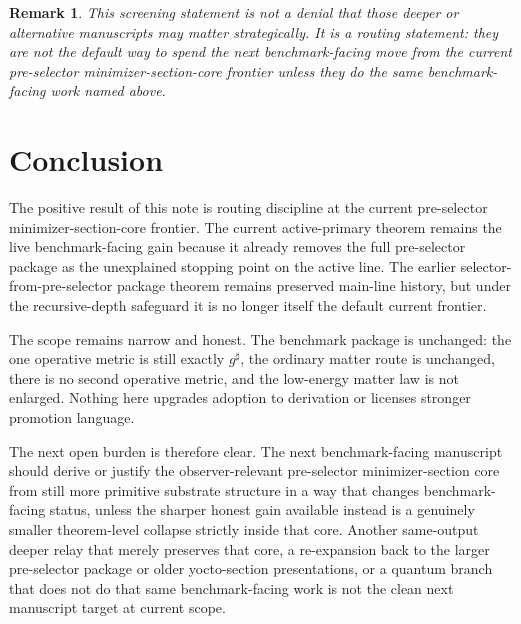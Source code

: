 \documentclass[11pt]{article}
\newcommand{\CompletedMetric}{g^{\sharp}}
\newtheorem{remark}{Remark}
\begin{document}
\begin{remark}
This screening statement is not a denial that those deeper or alternative manuscripts may matter strategically. It is a routing statement: they are not the default way to spend the next benchmark-facing move from the current pre-selector minimizer-section-core frontier unless they do the same benchmark-facing work named above.
\end{remark}

\section{Conclusion}

The positive result of this note is routing discipline at the current pre-selector minimizer-section-core frontier. The current active-primary theorem remains the live benchmark-facing gain because it already removes the full pre-selector package as the unexplained stopping point on the active line. The earlier selector-from-pre-selector package theorem remains preserved main-line history, but under the recursive-depth safeguard it is no longer itself the default current frontier.

The scope remains narrow and honest. The benchmark package is unchanged: the one operative metric is still exactly \(\CompletedMetric\), the ordinary matter route is unchanged, there is no second operative metric, and the low-energy matter law is not enlarged. Nothing here upgrades adoption to derivation or licenses stronger promotion language.

The next open burden is therefore clear. The next benchmark-facing manuscript should derive or justify the observer-relevant pre-selector minimizer-section core from still more primitive substrate structure in a way that changes benchmark-facing status, unless the sharper honest gain available instead is a genuinely smaller theorem-level collapse strictly inside that core. Another same-output deeper relay that merely preserves that core, a re-expansion back to the larger pre-selector package or older yocto-section presentations, or a quantum branch that does not do that same benchmark-facing work is not the clean next manuscript target at current scope.
\end{document}
